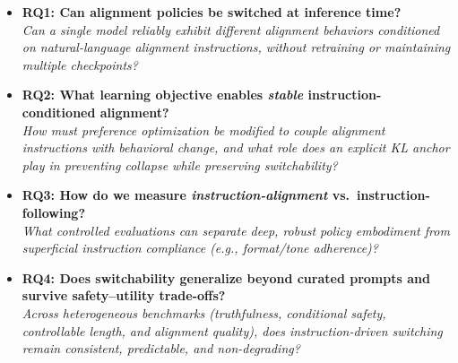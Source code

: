 {\scriptsize
\begin{tcolorbox}[
    colback=Teal!5!White,
    colframe=Teal!55!black,
    title=\textbf{Research Questions},
    fonttitle=\bfseries,
    boxrule=0.5pt,
    arc=2mm,
    left=2mm, right=2mm, top=1mm, bottom=1mm
]
\begin{itemize}[leftmargin=*, itemsep=2pt, topsep=2pt]

    \item[\ding{227}] \textbf{RQ1: Can alignment policies be switched at inference time?}\\
    \textit{Can a single model reliably exhibit different alignment behaviors conditioned on natural-language alignment instructions, \emph{without} retraining or maintaining multiple checkpoints?}

    \item[\ding{227}] \textbf{RQ2: What learning objective enables \emph{stable} instruction-conditioned alignment?}\\
    \textit{How must preference optimization be modified to couple alignment instructions with behavioral change, and what role does an explicit KL anchor play in preventing collapse while preserving switchability?}

    \item[\ding{227}] \textbf{RQ3: How do we measure \emph{instruction-alignment} vs.\ instruction-following?}\\
    \textit{What controlled evaluations can separate deep, robust policy embodiment from superficial instruction compliance (e.g., format/tone adherence)?}

    \item[\ding{227}] \textbf{RQ4: Does switchability generalize beyond curated prompts and survive safety--utility trade-offs?}\\
    \textit{Across heterogeneous benchmarks (truthfulness, conditional safety, controllable length, and alignment quality), does instruction-driven switching remain consistent, predictable, and non-degrading?}

\end{itemize}
\end{tcolorbox}
}
\vspace{-1em}





